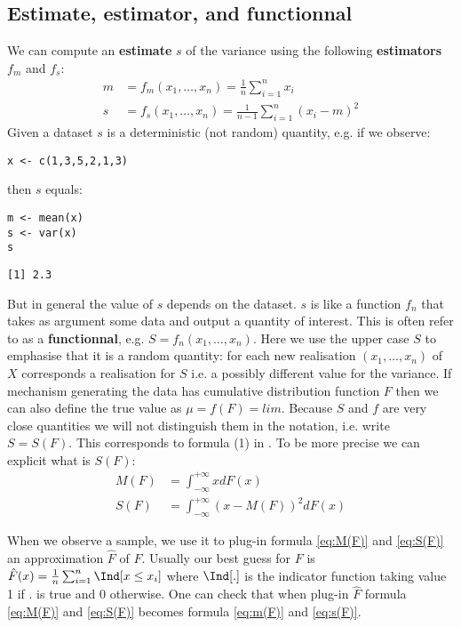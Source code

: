 \documentclass[12pt]{article}
\begin{document}
\subsection{Estimate, estimator, and functionnal}
\label{sec:orgfc15c92}

We can compute an \textbf{estimate} \(s\) of the variance using the following
\textbf{estimators} \(f_m\) and \(f_s\):
\begin{align}
m &= f_m(x_1,\ldots,x_n) = \frac{1}{n} \sum_{i=1}^n x_i \label{eq:m(F)} \\
s &= f_s(x_1,\ldots,x_n) = \frac{1}{n-1} \sum_{i=1}^n (x_i-m)^2 \label{eq:s(F)}
\end{align}
Given a dataset \(s\) is a deterministic (not random) quantity,
e.g. if we observe:
\lstset{language=r,label= ,caption= ,captionpos=b,numbers=none}
\begin{lstlisting}
x <- c(1,3,5,2,1,3)
\end{lstlisting}

then \(s\) equals:
\lstset{language=r,label= ,caption= ,captionpos=b,numbers=none}
\begin{lstlisting}
m <- mean(x)
s <- var(x)
s
\end{lstlisting}

\begin{verbatim}
[1] 2.3
\end{verbatim}

But in general the value of \(s\) depends on the dataset. \(s\) is
like a function \(f_n\) that takes as argument some data and output a
quantity of interest. This is often refer to as a \textbf{functionnal},
e.g. \(S=f_n(x_1,\ldots,x_n)\). Here we use the upper case \(S\) to
emphasise that it is a random quantity: for each new realisation
\((x_1,\ldots,x_n)\) of \(X\) corresponds a realisation for \(S\)
i.e. a possibly different value for the variance. If mechanism
generating the data has cumulative distribution function \(F\) then we
can also define the true value as \(\mu=f(F)=lim\). Because \(S\) and \(f\) are very close
quantities we will not distinguish them in the notation, i.e. write
\(S=S(F)\). This corresponds to formula (1) in \cite{lee1990u}. To be
more precise we can explicit what is \(S(F)\):
\begin{align}
M(F) &= \int_{-\infty}^{+\infty} x dF(x) \label{eq:M(F)}\\
S(F) &= \int_{-\infty}^{+\infty} (x - M(F))^2 dF(x) \label{eq:S(F)}
\end{align}

When we observe a sample, we use it to plug-in formula \eqref{eq:M(F)}
and \eqref{eq:S(F)} an approximation \(\hat{F}\) of \(F\). Usually our
best guess for \(F\) is \(\hat{F}(x)= \frac{1}{n}\sum_{i=1}^n
\Ind[x \leq x_i]\) where \(\Ind[.]\) is the indicator function taking value
1 if \(.\) is true and 0 otherwise. One can check that when plug-in
\(\hat{F}\) formula \eqref{eq:M(F)} and \eqref{eq:S(F)} becomes formula
\eqref{eq:m(F)} and \eqref{eq:s(F)}.
\end{document}
